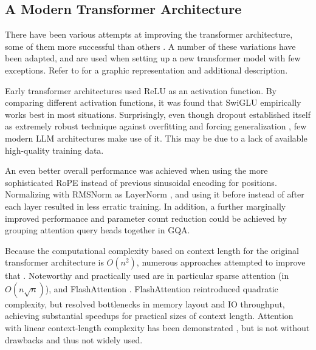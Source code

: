 

\subsection{A Modern Transformer Architecture}\label{sub:modern}

There have been various attempts at improving the transformer architecture, some of them more successful than others \cite{shazeer_glu_2020, su_roformer_2022, ainslie_gqa_2023, bolya_hydra_2022, sukhbaatar_adaptive_2019, lu_understanding_2019, ye_understanding_2023, wu_memorizing_2022}.
A number of these variations have been adapted, and are used when setting up a new transformer model with few exceptions.
Refer to  for a graphic representation and additional description.

Early transformer architectures used \gls{ReLU} as an activation function. By comparing different activation functions, it was found that \gls{SwiGLU} empirically works best in most situations. %
Surprisingly, even though dropout established itself as extremely robust technique against overfitting and forcing generalization  \cite{srivastava_dropout_2014}, few modern \gls{LLM} architectures make use of it.
This may be due to a lack of available high-quality training data.

An even better overall performance was achieved when using the more sophisticated \gls{RoPE} instead of previous sinusoidal encoding for positions.
Normalizing with RMSNorm as LayerNorm \cite{ba_layer_2016}, and using it before instead of after each layer resulted in less erratic training.
In addition, a further marginally improved performance and parameter count reduction could be achieved by grouping attention query heads together in \gls{GQA}.

Because the computational complexity based on context length for the original transformer architecture is $O(n^2)$, numerous approaches attempted to improve that \cite{child_generating_2019, wu_fastformer_2021, bolya_hydra_2022, hua_transformer_2022, dao_flashattention_2022}.
Noteworthy and practically used are in particular sparse attention \cite{child_generating_2019} (in $O(n\sqrt{n})$), and FlashAttention \cite{dao_flashattention_2022}.
FlashAttention reintroduced quadratic complexity, but resolved bottlenecks in memory layout and IO throughput, achieving substantial speedups for practical sizes of context length.
Attention with linear context-length complexity has been demonstrated \cite{wu_fastformer_2021, hua_transformer_2022}, but is not without drawbacks and thus not widely used.



